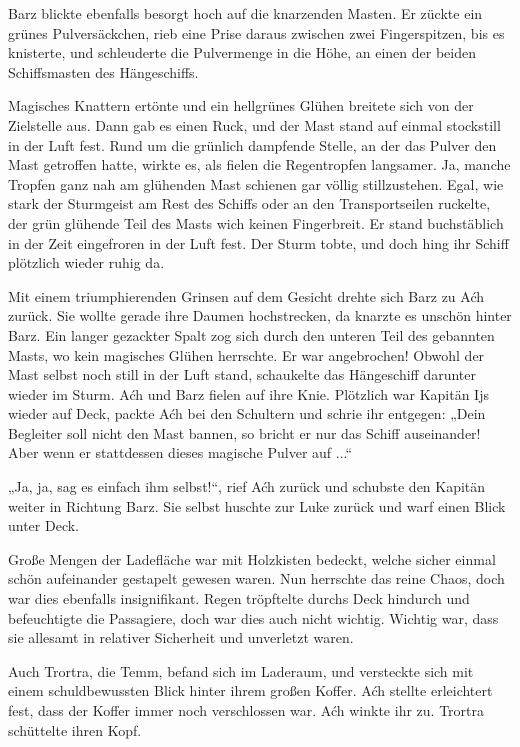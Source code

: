 Barz blickte ebenfalls besorgt hoch auf die knarzenden Masten. Er zückte ein grünes Pulversäckchen, rieb eine Prise daraus zwischen zwei Fingerspitzen, bis es knisterte, und schleuderte die Pulvermenge in die Höhe, an einen der beiden Schiffsmasten des Hängeschiffs.

Magisches Knattern ertönte und ein hellgrünes Glühen breitete sich von der Zielstelle aus. Dann gab es einen Ruck, und der Mast stand auf einmal stockstill in der Luft fest. Rund um die grünlich dampfende Stelle, an der das Pulver den Mast getroffen hatte, wirkte es, als fielen die Regentropfen langsamer. Ja, manche Tropfen ganz nah am glühenden Mast schienen gar völlig stillzustehen. Egal, wie stark der Sturmgeist am Rest des Schiffs oder an den Transportseilen ruckelte, der grün glühende Teil des Masts wich keinen Fingerbreit. Er stand buchstäblich in der Zeit eingefroren in der Luft fest. Der Sturm tobte, und doch hing ihr Schiff plötzlich wieder ruhig da.

Mit einem triumphierenden Grinsen auf dem Gesicht drehte sich Barz zu Aćh zurück. Sie wollte gerade ihre Daumen hochstrecken, da knarzte es unschön hinter Barz. Ein langer gezackter Spalt zog sich durch den unteren Teil des gebannten Masts, wo kein magisches Glühen herrschte. Er war angebrochen! Obwohl der Mast selbst noch still in der Luft stand, schaukelte das Hängeschiff darunter wieder im Sturm. Aćh und Barz fielen auf ihre Knie. Plötzlich war Kapitän Ijs wieder auf Deck, packte Aćh bei den Schultern und schrie ihr entgegen: „Dein Begleiter soll nicht den Mast bannen, so bricht er nur das Schiff auseinander! Aber wenn er stattdessen dieses magische Pulver auf ...“

„Ja, ja, sag es einfach ihm selbst!“, rief Aćh zurück und schubste den Kapitän weiter in Richtung Barz. Sie selbst huschte zur Luke zurück und warf einen Blick unter Deck.

Große Mengen der Ladefläche war mit Holzkisten bedeckt, welche sicher einmal schön aufeinander gestapelt gewesen waren. Nun herrschte das reine Chaos, doch war dies ebenfalls insignifikant. Regen tröpftelte durchs Deck hindurch und befeuchtigte die Passagiere, doch war dies auch nicht wichtig. Wichtig war, dass sie allesamt in relativer Sicherheit und unverletzt waren.

Auch Trortra, die Temm, befand sich im Laderaum, und versteckte sich mit einem schuldbewussten Blick hinter ihrem großen Koffer. Aćh stellte erleichtert fest, dass der Koffer immer noch verschlossen war. Aćh winkte ihr zu. Trortra schüttelte ihren Kopf.

